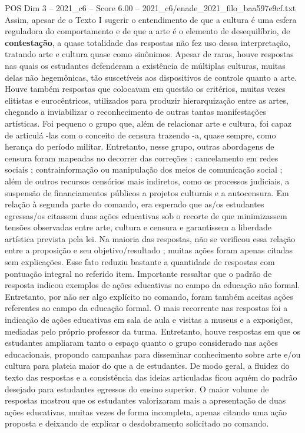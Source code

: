 \begin{textsample}{POS Dim 3 – 2021\_c6 – Score 6.00 – 2021\_c6/enade\_2021\_filo\_baa597e9cf.txt}
Assim, apesar de o Texto I sugerir o entendimento de que a cultura é uma esfera reguladora do comportamento e de que a arte é o elemento de desequilíbrio, de \textbf{contestação}, a quase totalidade das respostas não fez uso dessa interpretação, tratando arte e cultura quase como sinônimos.
Apesar de raras, houve respostas nas quais os estudantes defenderam a existência de múltiplas culturas, muitas delas não hegemônicas, tão suscetíveis aos dispositivos de controle quanto a arte.
Houve também respostas que colocavam em questão os critérios, muitas vezes elitistas e eurocêntricos, utilizados para produzir hierarquização entre as artes, chegando a inviabilizar o reconhecimento de outras tantas manifestações artísticas.
Foi pequeno o grupo que, além de relacionar arte e cultura, foi capaz de articulá -las com o conceito de censura trazendo -a, quase sempre, como herança do período militar.
Entretanto, nesse grupo, outras abordagens de censura foram mapeadas no decorrer das correções : cancelamento em redes sociais ; contrainformação ou manipulação dos meios de comunicação social ; além de outros recursos censórios mais indiretos, como os processos judiciais, a suspensão de financiamentos públicos a projetos culturais e a autocensura.
Em relação à segunda parte do comando, era esperado que as/os estudantes egressas/os citassem duas ações educativas sob o recorte de que minimizassem tensões observadas entre arte, cultura e censura e garantissem a liberdade artística prevista pela lei.
Na maioria das respostas, não se verificou essa relação entre a proposição e seu objetivo/resultado ; muitas ações foram apenas citadas sem explicações.
Esse fato reduziu bastante a quantidade de respostas com pontuação integral no referido item.
Importante ressaltar que o padrão de resposta indicou exemplos de ações educativas no campo da educação não formal.
Entretanto, por não ser algo explícito no comando, foram também aceitas ações referentes ao campo da educação formal.
O mais recorrente nas respostas foi a indicação de ações educativas em sala de aula e visitas a museus e a exposições, mediadas pelo próprio professor da turma.
Entretanto, houve respostas em que os estudantes ampliaram tanto o espaço quanto o grupo considerado nas ações educacionais, propondo campanhas para disseminar conhecimento sobre arte e/ou cultura para plateia maior do que a de estudantes.
De modo geral, a fluidez do texto das respostas e a consistência das ideias articuladas ficou aquém do padrão desejado para estudantes egressos do ensino superior.
O maior volume de respostas mostrou que os estudantes valorizaram mais a apresentação de duas ações educativas, muitas vezes de forma incompleta, apenas citando uma ação proposta e deixando de explicar o desdobramento solicitado no comando.

\end{textsample}
